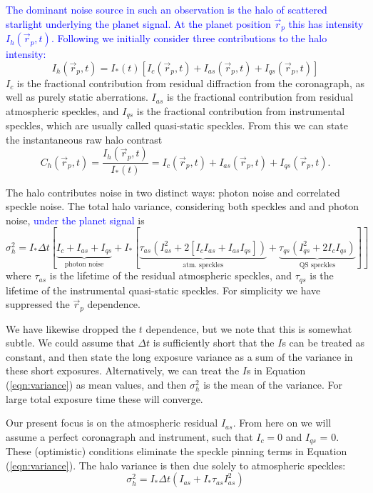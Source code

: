 \documentclass[10pt,preprint]{aastex631}
\newcommand{\jrmadd}[1]{\textcolor{blue}{#1}}
\begin{document}
\jrmadd{The dominant noise source in such an observation is the halo of scattered starlight underlying the planet signal.  At the planet position $\vec{r}_p$ this has intensity $I_h(\vec{r}_p,t)$. Following \citet{2007ApJ...669..642S} we initially consider three contributions to the halo intensity:}
\begin{equation}
I_h(\vec{r}_p,t) = I_{*}(t)\left[I_c(\vec{r}_p,t) + I_{as}(\vec{r}_p,t) + I_{qs}(\vec{r}_p,t)\right]
\end{equation}
$I_c$ is the fractional contribution from residual diffraction from the coronagraph, as well as purely static aberrations.  $I_{as}$ is the fractional contribution from residual atmospheric speckles, and $I_{qs}$ is the fractional contribution from instrumental speckles, which are usually called quasi-static speckles.  
From this we can state the instantaneous raw halo contrast
\begin{equation}
C_h(\vec{r}_p,t) = \frac{I_h(\vec{r}_p,t)}{I_*(t)} = I_c(\vec{r}_p,t) + I_{as}(\vec{r}_p,t) + I_{qs}(\vec{r}_p,t).
\end{equation}

The halo contributes noise in two distinct ways: photon noise and correlated speckle noise. The total halo variance, considering both speckles and and photon noise, \jrmadd{under the planet signal} is \citep{2007ApJ...669..642S} 
\begin{equation}
\sigma^2_{h}  = I_* \Delta t [\underbrace{I_c + I_{as} + I_{qs}}_{\mbox{photon noise}} + I_* [ \underbrace{\tau_{as}\left(I_{as}^2 + 2[I_cI_{as} + I_{as}I_{qs}]  \right)}_{\mbox{atm. speckles}} +  \underbrace{\tau_{qs}\left( I_{qs}^2 + 2 I_c I_{qs}\right)}_{\mbox{QS speckles}}]]
\label{eqn:variance}
\end{equation}
where $\tau_{as}$ is the lifetime of the residual atmospheric speckles, and $\tau_{qs}$ is the lifetime of the instrumental quasi-static speckles.  For simplicity we have suppressed the $\vec{r}_p$ dependence.   

We have likewise dropped the $t$ dependence, but we note that this is somewhat subtle.  We could assume that $\Delta t$ is sufficiently short that the $I$s can be treated as constant, and then state the long exposure variance as a sum of the variance in these short exposures.  Alternatively, we can treat the $I$s in Equation (\ref{eqn:variance}) as mean values, and then $\sigma^2_{h}$ is the mean of the variance.  For large total exposure time these will converge.

Our present focus is on the atmospheric residual $I_{as}$.  From here on we will assume a perfect coronagraph and instrument, such that $I_c = 0$ and $I_{qs}$ = 0.  These (optimistic) conditions eliminate the speckle pinning \citep{2001ApJ...558L..71B} terms in Equation (\ref{eqn:variance}).  The halo variance is then due solely to atmospheric speckles:
\begin{equation}
\sigma^2_{h}  = I_* \Delta t \left(I_{as} + I_* \tau_{as} I_{as}^2 \right)
\label{eqn:variance_as}
\end{equation}
\end{document}

